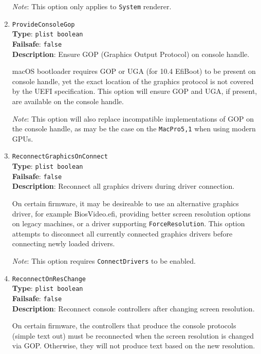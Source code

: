 \documentclass[]{article}
\begin{document}
\begin{enumerate}
  \emph{Note}: This option only applies to \texttt{System} renderer.

\item
  \texttt{ProvideConsoleGop}\\
  \textbf{Type}: \texttt{plist\ boolean}\\
  \textbf{Failsafe}: \texttt{false}\\
  \textbf{Description}: Ensure GOP (Graphics Output Protocol) on console handle.

  macOS bootloader requires GOP or UGA (for 10.4 EfiBoot) to be present on console
  handle, yet the exact location of the graphics protocol is not covered by the
  UEFI specification. This option will ensure GOP and UGA, if present, are available
  on the console handle.

  \emph{Note}: This option will also replace incompatible implementations of GOP on the
  console handle, as may be the case on the \texttt{MacPro5,1} when using modern GPUs.

\item
  \texttt{ReconnectGraphicsOnConnect}\\
  \textbf{Type}: \texttt{plist\ boolean}\\
  \textbf{Failsafe}: \texttt{false}\\
  \textbf{Description}: Reconnect all graphics drivers during driver connection.

  On certain firmware, it may be desireable to use an alternative graphics driver,
  for example BiosVideo.efi, providing better screen resolution options on legacy
  machines, or a driver supporting \texttt{ForceResolution}. This option attempts
  to disconnect all currently connected graphics drivers before connecting newly
  loaded drivers.

  \emph{Note}: This option requires \texttt{ConnectDrivers} to be enabled.

\item
  \texttt{ReconnectOnResChange}\\
  \textbf{Type}: \texttt{plist\ boolean}\\
  \textbf{Failsafe}: \texttt{false}\\
  \textbf{Description}: Reconnect console controllers after changing screen resolution.

  On certain firmware, the controllers that produce the console protocols (simple text out)
  must be reconnected when the screen resolution is changed via GOP. Otherwise, they will
  not produce text based on the new resolution.


\end{enumerate}
\end{document}
